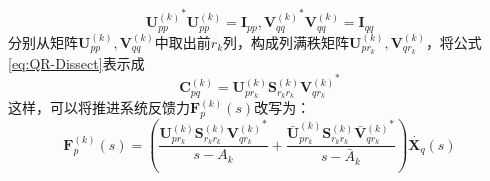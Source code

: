 \begin{equation}
{\boldsymbol{U}_{pp}^{(k)}}^*\boldsymbol{U}_{pp}^{(k)}=\boldsymbol{I}_{pp},
{\boldsymbol{V}_{qq}^{(k)}}^*\boldsymbol{V}_{qq}^{(k)}=\boldsymbol{I}_{qq}
\end{equation}
分别从矩阵$\boldsymbol{U}_{pp}^{(k)}, \boldsymbol{V}_{qq}^{(k)}$中取出前$r_k$列，构成列满秩矩阵$\boldsymbol{U}_{pr_k}^{(k)}, \boldsymbol{V}_{qr_k}^{(k)}$，将公式\eqref{eq:QR-Dissect}表示成
\begin{equation}
	\boldsymbol{C}_{pq}^{(k)}=\boldsymbol{U}_{pr_k}^{(k)}\boldsymbol{S}_{r_kr_k}^{(k)}{\boldsymbol{V}_{qr_k}^{(k)}}^{*}
\end{equation}
这样，可以将推进系统反馈力$\boldsymbol{F}_p^{(k)}(s)$改写为：
\begin{equation}
	\label{eq:Single-SVD-Feedback-Force}
	\boldsymbol{F}_p^{(k)}(s)=\left( \frac{
	\boldsymbol{U}_{pr_k}^{(k)}\boldsymbol{S}_{r_kr_k}^{(k)}{\boldsymbol{V}_{qr_k}^{(k)}}^{*}
	}{s-A_k}+ \frac{
	\boldsymbol{\bar{U}}_{pr_k}^{(k)}\boldsymbol{S}_{r_kr_k}^{(k)}{\boldsymbol{\bar{V}}}{{}_{qr_k}^{(k)}}^{*}
	}{s-\bar{A}_k} \right) \dot{\boldsymbol{X}_q}(s)
\end{equation}

